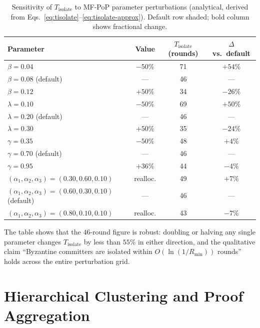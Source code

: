 \documentclass[journal]{IEEEtran}
\renewcommand{\arraystretch}{1.2}
\begin{document}
\begin{table}[t]
\centering
\caption{Sensitivity of $T_{\mathrm{isolate}}$ to MF-PoP parameter perturbations (analytical, derived from Eqs.~\ref{eq:tisolate}--\ref{eq:tisolate-approx}). Default row shaded; bold column shows fractional change.}
\label{tab:sensitivity}
\renewcommand{\arraystretch}{1.3}
\begin{tabular}{lccc}
\toprule
Parameter & Value & $T_{\mathrm{isolate}}$ (rounds) & $\Delta$ vs.\ default \\
\midrule
$\beta = 0.04$ & $-50\%$ & 71 & $+54\%$ \\
$\beta = 0.08$ (default) & --- & 46 & --- \\
$\beta = 0.12$ & $+50\%$ & 34 & $-26\%$ \\
\midrule
$\lambda = 0.10$ & $-50\%$ & 69 & $+50\%$ \\
$\lambda = 0.20$ (default) & --- & 46 & --- \\
$\lambda = 0.30$ & $+50\%$ & 35 & $-24\%$ \\
\midrule
$\gamma = 0.35$ & $-50\%$ & 48 & $+4\%$ \\
$\gamma = 0.70$ (default) & --- & 46 & --- \\
$\gamma = 0.95$ & $+36\%$ & 44 & $-4\%$ \\
\midrule
$(\alpha_1,\alpha_2,\alpha_3) = (0.30,0.60,0.10)$ & realloc. & 49 & $+7\%$ \\
$(\alpha_1,\alpha_2,\alpha_3) = (0.60,0.30,0.10)$ (default) & --- & 46 & --- \\
$(\alpha_1,\alpha_2,\alpha_3) = (0.80,0.10,0.10)$ & realloc. & 43 & $-7\%$ \\
\bottomrule
\end{tabular}
\end{table}

The table shows that the $46$-round figure is robust: doubling or halving any single parameter changes $T_{\mathrm{isolate}}$ by less than $55\%$ in either direction, and the qualitative claim ``Byzantine committers are isolated within $O(\ln(1/R_{\min}))$ rounds'' holds across the entire perturbation grid.

\section{Hierarchical Clustering and Proof Aggregation}
\end{document}
